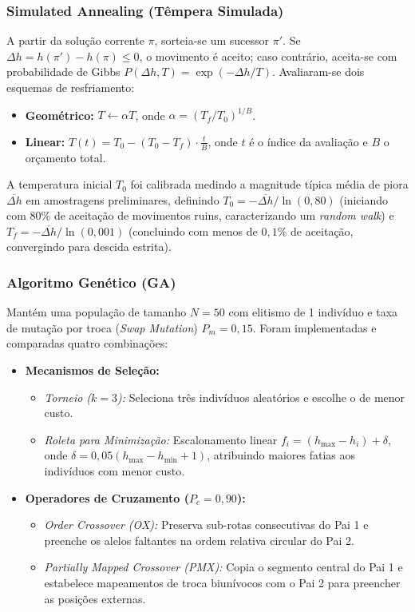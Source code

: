 \documentclass[11pt,a4paper]{article}
\begin{document}
\subsubsection{Simulated Annealing (Têmpera Simulada)}
A partir da solução corrente $\pi$, sorteia-se um sucessor $\pi'$. Se $\Delta h = h(\pi') - h(\pi) \le 0$, o movimento é aceito; caso contrário, aceita-se com probabilidade de Gibbs $P(\Delta h, T) = \exp(-\Delta h / T)$. 
Avaliaram-se dois esquemas de resfriamento:
\begin{itemize}
    \item \textbf{Geométrico:} $T \leftarrow \alpha T$, onde $\alpha = (T_f / T_0)^{1/B}$.
    \item \textbf{Linear:} $T(t) = T_0 - (T_0 - T_f) \cdot \frac{t}{B}$, onde $t$ é o índice da avaliação e $B$ o orçamento total.
\end{itemize}
A temperatura inicial $T_0$ foi calibrada medindo a magnitude típica média de piora $\overline{\Delta h}$ em amostragens preliminares, definindo $T_0 = -\overline{\Delta h} / \ln(0{,}80)$ (iniciando com $80\%$ de aceitação de movimentos ruins, caracterizando um \emph{random walk}) e $T_f = -\overline{\Delta h} / \ln(0{,}001)$ (concluindo com menos de $0{,}1\%$ de aceitação, convergindo para descida estrita).

\subsubsection{Algoritmo Genético (GA)}
Mantém uma população de tamanho $N=50$ com elitismo de 1 indivíduo e taxa de mutação por troca (\emph{Swap Mutation}) $P_m = 0{,}15$. Foram implementadas e comparadas quatro combinações:
\begin{itemize}
    \item \textbf{Mecanismos de Seleção:}
    \begin{itemize}
        \item \emph{Torneio ($k=3$):} Seleciona três indivíduos aleatórios e escolhe o de menor custo.
        \item \emph{Roleta para Minimização:} Escalonamento linear $f_i = (h_{\max} - h_i) + \delta$, onde $\delta = 0{,}05(h_{\max} - h_{\min} + 1)$, atribuindo maiores fatias aos indivíduos com menor custo.
    \end{itemize}
    \item \textbf{Operadores de Cruzamento ($P_c = 0{,}90$):}
    \begin{itemize}
        \item \emph{Order Crossover (OX):} Preserva sub-rotas consecutivas do Pai 1 e preenche os alelos faltantes na ordem relativa circular do Pai 2.
        \item \emph{Partially Mapped Crossover (PMX):} Copia o segmento central do Pai 1 e estabelece mapeamentos de troca biunívocos com o Pai 2 para preencher as posições externas.
    \end{itemize}
\end{itemize}
\end{document}
